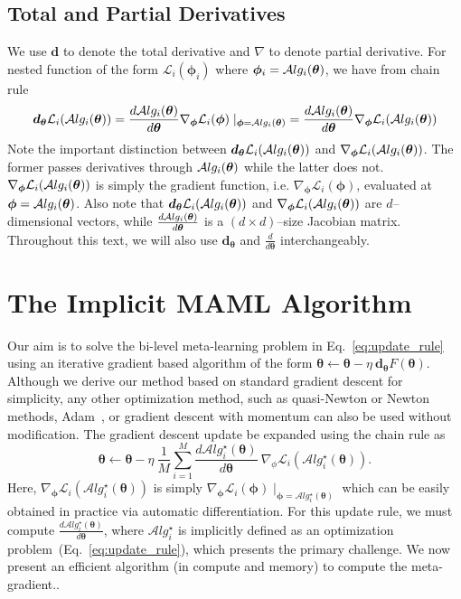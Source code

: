 \documentclass{article} \usepackage[nonatbib, final]{mod_neurips}
\newcommand{\param}{{\bm{\phi}}}               \newcommand{\paramspace}{\Phi}
\newcommand{\prior}{{\bm{\theta}}}               \newcommand{\priorspace}{\Theta}
\newcommand{\fn}{\mathcal{L}}                  \newcommand{\udfn}{\tilde{\fn}}        \newcommand{\fnht}{\hat{\fn}}        \newcommand{\ud}{\alg}
\newcommand{\algstar}{\mathcal{A}lg^\star}
\newcommand{\grad}{\bm{d}}
\newcommand{\pgrad}{\nabla}
\begin{document}
\subsection{Total and Partial Derivatives}

We use $\grad$ to denote the total derivative and $\pgrad$ to denote partial derivative. For nested function of the form $\fn_i(\param_i)$ where $\param_i=\alg_i(\prior)$, we
have from chain rule  
\begin{equation*}
\grad_\prior \fn_i(\alg_i(\prior))
= {\frac{d\alg_i(\prior)}{d\prior} \pgrad_\param \fn_i(\param)\mid_{\param=\alg_i(\prior)}}
= {\frac{d\alg_i(\prior)}{d\prior} \pgrad_\param \fn_i(\alg_i(\prior))}
\end{equation*}
Note the important distinction between $\grad_\prior
\fn_i(\alg_i(\prior))$ and $\pgrad_\param \fn_i(\alg_i(\prior))$. The former
passes derivatives through $\alg_i(\prior)$ while the latter does
not. $\pgrad_\param \fn_i(\alg_i(\prior))$ is simply the gradient
function, i.e. $\pgrad_\param \fn_i(\param)$, evaluated at
$\param=\alg_i(\prior)$. Also note that $\grad_\prior
\fn_i(\alg_i(\prior))$ and $\pgrad_\param \fn_i(\alg_i(\prior))$ are $d$--dimensional vectors, while $\frac{d\alg_i(\prior)}{d\prior}$ is a $(d \times d)$--size Jacobian matrix. Throughout this text, we will also use $\grad_\prior$ and
$\frac{d}{d\prior}$ interchangeably.  \section{The Implicit MAML Algorithm}

Our aim is to solve the bi-level meta-learning problem in Eq.~\ref{eq:update_rule} using an iterative gradient based algorithm of the form $\prior \leftarrow \prior - \eta \ \grad_\prior F(\prior)$. Although we derive our method based on standard gradient descent for simplicity, any other optimization method, such as quasi-Newton or Newton methods, Adam~\cite{adam}, or gradient descent with momentum can also be used without modification.
The gradient descent update be expanded using the chain rule as
\begin{equation}
    \label{eq:outer_update_rule}
    \prior \leftarrow \prior - \eta \ \frac{1}{M} \sum_{i=1}^M \frac{d \algstar_i (\prior)}{d \prior} \ \pgrad_\phi \fn_i(\algstar_i(\prior)).
\end{equation}
Here, $\pgrad_\param \fn_i(\algstar_i(\prior))$ is simply
$\pgrad_\param \fn_i(\param)\mid_{\param=\algstar_i(\prior)}$ which
can be easily obtained in practice via automatic differentiation. For
this update rule, we must compute
$\frac{d\algstar_i(\prior)}{d\prior}$, where $\algstar_i$ is
implicitly defined as an optimization
problem~(Eq.~\ref{eq:update_rule}), which presents the primary
challenge. We now present an efficient algorithm (in compute and memory) to compute the meta-gradient..
\end{document}
